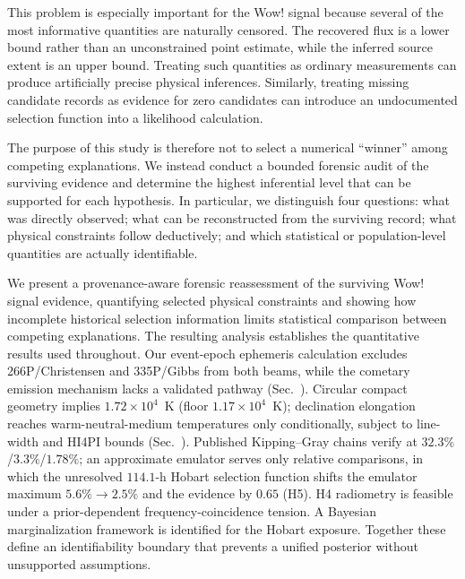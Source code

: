 \documentclass[twocolumn]{aastex701}
\begin{document}
This problem is especially important for the Wow! signal because several of the most informative quantities are naturally censored. The recovered flux is a lower bound rather than an unconstrained point estimate, while the inferred source extent is an upper bound. Treating such quantities as ordinary measurements can produce artificially precise physical inferences. Similarly, treating missing candidate records as evidence for zero candidates can introduce an undocumented selection function into a likelihood calculation.

The purpose of this study is therefore not to select a numerical ``winner'' among competing explanations. We instead conduct a bounded forensic audit of the surviving evidence and determine the highest inferential level that can be supported for each hypothesis. In particular, we distinguish four questions: what was directly observed; what can be reconstructed from the surviving record; what physical constraints follow deductively; and which statistical or population-level quantities are actually identifiable.

We present a provenance-aware forensic reassessment of the surviving Wow! signal evidence, quantifying selected physical constraints and showing how incomplete historical selection information limits statistical comparison between competing explanations. The resulting analysis establishes the quantitative results used throughout. Our event-epoch ephemeris calculation excludes 266P/Christensen and 335P/Gibbs from both beams, while the cometary emission mechanism lacks a validated pathway (Sec.~). Circular compact geometry implies $1.72\times10^4$~K (floor $1.17\times10^4$~K); declination elongation reaches warm-neutral-medium temperatures only conditionally, subject to line-width and HI4PI bounds (Sec.~). Published Kipping--Gray chains verify at $32.3\%$/$3.3\%$/$1.78\%$; an approximate emulator serves only relative comparisons, in which the unresolved $114.1$-h Hobart selection function shifts the emulator maximum $5.6\%\to2.5\%$ and the evidence by $0.65$ (H5). H4 radiometry is feasible under a prior-dependent frequency-coincidence tension. A Bayesian marginalization framework is identified for the Hobart exposure. Together these define an identifiability boundary that prevents a unified posterior without unsupported assumptions.

\end{document}
